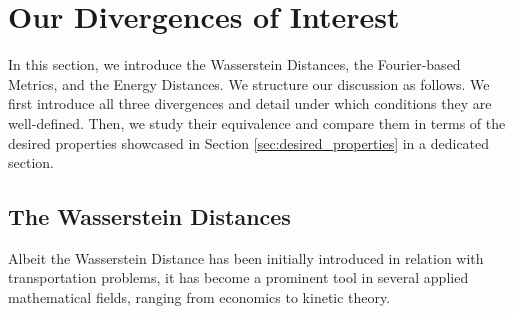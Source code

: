 \documentclass{article}
\begin{document}







\section{Our Divergences of Interest}
\label{sec:metrics}

In this section, we introduce the Wasserstein Distances, the Fourier-based Metrics, and the Energy Distances.
% 
We structure our discussion as follows.
% 
We first introduce all three divergences and detail under which conditions they are well-defined.
% 
Then, we study their equivalence and compare them in terms of the desired properties showcased in Section \ref{sec:desired_properties} in a dedicated section.


\subsection{The Wasserstein Distances}
 
% 
% 
Albeit the Wasserstein Distance has been initially introduced in relation with transportation problems, it has become a prominent tool in several applied mathematical fields, ranging from economics to kinetic theory.
% 
% 
\end{document}
